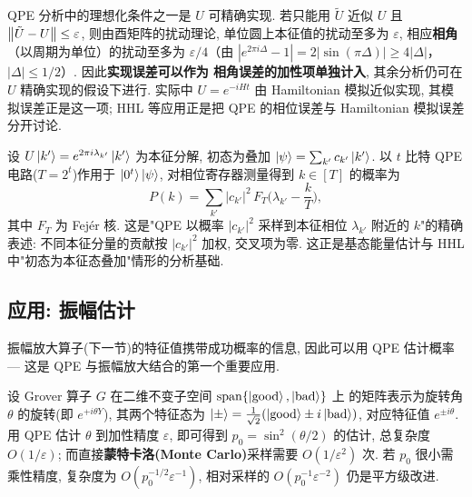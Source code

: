 \documentclass[utf8]{article} %
\numberwithin{equation}{section}   %
\newtheorem{Prop}{\hskip 2em {\color{cyan} 命题}}[subsection]
\newtheorem{Note}{\hskip 2em {\color{red} 注}}[subsection]
\begin{document}
\begin{Note}
    QPE 分析中的理想化条件之一是 $U$ 可精确实现. 若只能用 $\tilde U$ 近似 $U$ 且
    $\norm{\tilde U - U} \le \varepsilon$, 则由酉矩阵的扰动理论, 单位圆上本征值的扰动至多为
    $\varepsilon$, 相应\textbf{相角}（以周期为单位）的扰动至多为 $\varepsilon/4$（由 $|e^{2\pi i\Delta}-1|=2|\sin(\pi\Delta)|\ge 4|\Delta|$，$|\Delta|\le 1/2$）. 因此\textbf{实现误差可以作为
    相角误差的加性项单独计入}, 其余分析仍可在 $U$ 精确实现的假设下进行. 实际中
    $U = e^{-iHt}$ 由 Hamiltonian 模拟近似实现, 其模拟误差正是这一项;
    HHL 等应用正是把 QPE 的相位误差与 Hamiltonian 模拟误差分开讨论.
\end{Note}

\begin{Prop}
    设 $U\ket{k'} = e^{2\pi i\lambda_{k'}}\ket{k'}$ 为本征分解, 初态为叠加
    $\ket{\psi} = \sum_{k'} c_{k'}\ket{k'}$. 以 $t$ 比特 QPE 电路($T = 2^t$)作用于
    $\ket{0^t}\ket{\psi}$, 对相位寄存器测量得到 $k \in [T]$ 的概率为
    \begin{equation}
        P(k) = \sum_{k'} |c_{k'}|^2\, F_T\Big(\lambda_{k'} - \frac{k}{T}\Big),
    \end{equation}
    其中 $F_T$ 为 Fejér 核. 这是"QPE 以概率 $|c_{k'}|^2$ 采样到本征相位
    $\lambda_{k'}$ 附近的 $k$"的精确表述: 不同本征分量的贡献按 $|c_{k'}|^2$ 加权, 
    交叉项为零. 这正是基态能量估计与 HHL 中"初态为本征态叠加"情形的分析基础.
\end{Prop}

\subsection{应用: 振幅估计}

振幅放大算子(下一节)的特征值携带成功概率的信息, 因此可以用 QPE 估计概率 ---
这是 QPE 与振幅放大结合的第一个重要应用.

\begin{Prop}[振幅估计]
    设 Grover 算子 $G$ 在二维不变子空间 $\mathrm{span}\{\ket{\mathrm{good}}, \ket{\mathrm{bad}}\}$ 上
    的矩阵表示为旋转角 $\theta$ 的旋转(即 $e^{+i\theta Y}$),
    其两个特征态为 $\ket{\pm} = \frac{1}{\sqrt{2}}(\ket{\mathrm{good}} \pm i\ket{\mathrm{bad}})$,
    对应特征值 $e^{\pm i\theta}$.
    用 QPE 估计 $\theta$ 到加性精度 $\varepsilon$, 即可得到 $p_0 = \sin^2(\theta/2)$ 的估计, 
    总复杂度 $O(1/\varepsilon)$; 而直接\textbf{蒙特卡洛(Monte Carlo)}采样需要 $O(1/\varepsilon^2)$ 次.
    若 $p_0$ 很小需乘性精度, 复杂度为 $O(p_0^{-1/2}\varepsilon^{-1})$, 相对采样的
    $O(p_0^{-1}\varepsilon^{-2})$ 仍是平方级改进.
\end{Prop}
\end{document}
